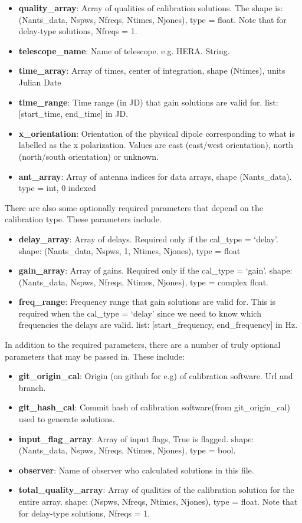 \documentclass[11pt, oneside]{article}   	%
\begin{document}
\begin{itemize}
{    jll. jrl, jlr).}
\item{\textbf{quality\_array}: Array of qualities of calibration solutions. The
    shape is: (Nants\_data, Nspws, Nfreqs, Ntimes, Njones), type = float. Note
    that for delay-type solutions, Nfreqs = 1.}
\item{\textbf{telescope\_name}: Name of telescope. e.g. HERA. String.}
\item{\textbf{time\_array}: Array of times, center of integration, shape
    (Ntimes), units Julian Date}
\item{\textbf{time\_range}: Time range (in JD) that gain solutions are valid
    for. list: [start\_time, end\_time] in JD.}
\item{\textbf{x\_orientation}: Orientation of the physical dipole corresponding
    to what is labelled as the x polarization. Values are east (east/west
    orientation), north (north/south orientation) or unknown.}
\item{\textbf{ant\_array}: Array of antenna indices for data arrays, shape
    (Nants\_data). type = int, 0 indexed}
\end{itemize}

There are also some optionally required parameters that depend on the
calibration type. These parameters include.
\begin{itemize}
\item{\textbf{delay\_array}: Array of delays. Required only if the cal\_type =
    `delay'. shape: (Nants\_data, Nspws, 1, Ntimes, Njones), type = float}
\item{\textbf{gain\_array}: Array of gains. Required only if the cal\_type =
    `gain'.  shape: (Nants\_data, Nspws, Nfreqs, Ntimes, Njones), type = complex
    float.}
\item{\textbf{freq\_range}: Frequency range that gain solutions are valid
    for. This is required when the cal\_type = `delay' since we need to know
    which frequencies the delays are valid. list: [start\_frequency,
    end\_frequency] in Hz.}
\end{itemize}

In addition to the required parameters, there are a number of truly optional
parameters that may be passed in. These include:

\begin{itemize}
\item{\textbf{git\_origin\_cal}: Origin (on github for e.g) of calibration
    software. Url and branch.}
\item{\textbf{git\_hash\_cal}: Commit hash of calibration software(from
    git\_origin\_cal) used to generate solutions.}
\item{\textbf{input\_flag\_array}: Array of input flags, True is flagged. shape:
    (Nants\_data, Nspws, Nfreqs, Ntimes, Njones), type = bool.}
\item{\textbf{observer}: Name of observer who calculated solutions in this
    file.}
\item{\textbf{total\_quality\_array}: Array of qualities of the calibration
    solution for the entire array. shape: (Nspws, Nfreqs, Ntimes, Njones), type
    = float. Note that for delay-type solutions, Nfreqs = 1.}
\end{itemize}
\end{document}
